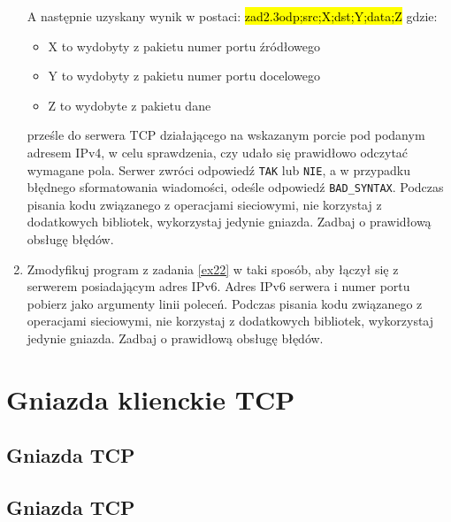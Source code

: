 \documentclass{article}
\newcommand{\hlc}[2][shadecolor]{ 	{\sethlcolor{#1} \hl{#2}} }
\begin{document}
\begin{enumerate}[label=\textbf{2.\arabic*}]
\noindent A następnie uzyskany wynik w postaci: \hlc[shadecolor]{ zad2.3odp;src;X;dst;Y;data;Z } gdzie:

\begin{itemize}
\item X to wydobyty z pakietu numer portu źródłowego
\item Y to wydobyty z pakietu numer portu docelowego
\item Z to wydobyte z pakietu dane 
\end{itemize}

 prześle do serwera TCP działającego na wskazanym porcie pod podanym adresem IPv4, w celu sprawdzenia, czy udało się prawidłowo odczytać wymagane pola. Serwer zwróci odpowiedź \texttt{TAK} lub \texttt{NIE}, a w przypadku błędnego sformatowania wiadomości, odeśle odpowiedź \texttt{BAD\_SYNTAX}.  Podczas pisania kodu związanego z operacjami sieciowymi, nie korzystaj z dodatkowych bibliotek, wykorzystaj jedynie gniazda. Zadbaj o prawidłową obsługę błędów. 
 

  \item Zmodyfikuj program z zadania \ref{ex22} w taki sposób,  aby łączył się z serwerem posiadającym adres IPv6.  Adres IPv6 serwera i numer portu pobierz jako argumenty linii poleceń. Podczas pisania kodu związanego z operacjami sieciowymi, nie korzystaj z dodatkowych bibliotek, wykorzystaj jedynie gniazda. Zadbaj o prawidłową obsługę błędów. 

\end{enumerate}

\newpage
\section{Gniazda klienckie TCP}

\subsection*{Gniazda TCP}


\newpage 
\subsection*{Gniazda TCP}
\end{document}
